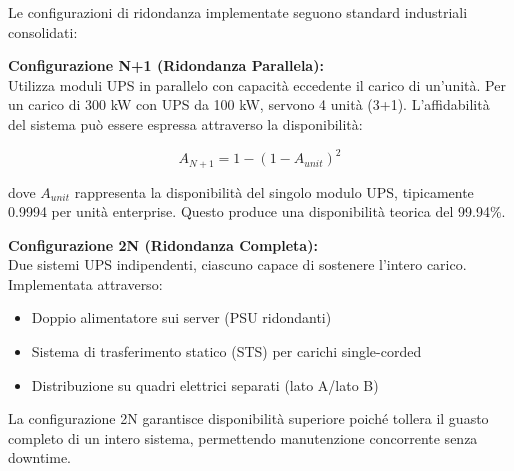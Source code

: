 Le configurazioni di ridondanza implementate seguono standard industriali consolidati:

\textbf{Configurazione N+1 (Ridondanza Parallela):}\\
Utilizza moduli UPS in parallelo con capacità eccedente il carico di un'unità. Per un carico di 300 kW con UPS da 100 kW, servono 4 unità (3+1). L'affidabilità del sistema può essere espressa attraverso la disponibilità:

\begin{equation}
A_{N+1} = 1 - (1 - A_{unit})^2
\end{equation}

dove $A_{unit}$ rappresenta la disponibilità del singolo modulo UPS, tipicamente 0.9994 per unità enterprise\autocite{IEEE2024}. Questo produce una disponibilità teorica del 99.94\%.

\textbf{Configurazione 2N (Ridondanza Completa):}\\
Due sistemi UPS indipendenti, ciascuno capace di sostenere l'intero carico. Implementata attraverso:
\begin{itemize}
    \item Doppio alimentatore sui server (PSU ridondanti)
    \item Sistema di trasferimento statico (STS) per carichi single-corded
    \item Distribuzione su quadri elettrici separati (lato A/lato B)
\end{itemize}

La configurazione 2N garantisce disponibilità superiore poiché tollera il guasto completo di un intero sistema, permettendo manutenzione concorrente senza downtime.

% 


